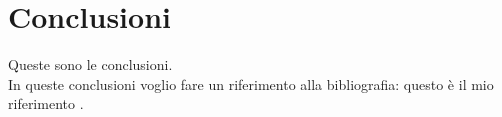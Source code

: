 \chapter*{Conclusioni}

Queste sono le conclusioni.\\

In queste conclusioni voglio fare un riferimento alla
bibliografia: questo \`e il mio riferimento \cite{K3,K4}.
